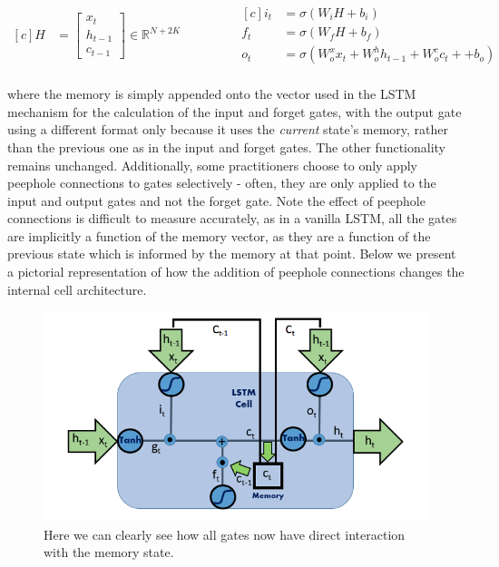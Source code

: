 \documentclass{article} %
\begin{document}
\begin{equation}
\begin{aligned}[c]
 H &= \left[ \begin{array}{cc}
         x_{t}  \\
         h_{t-1} \\
         c_{t-1}
    \end{array} \right] \in \mathbb{R}^{N+2K} \\
\end{aligned}
\qquad \qquad
    \begin{aligned}[c]
    i_{t} &= \sigma(W_{i}H + b_{i})\\
    f_{t} &= \sigma(W_{f}H + b_{f})\\
    o_{t} &= \sigma(W_{o}^{x}x_{t} + W_{o}^{h}h_{t-1} + W_{o}^{c}c_{t} +  + b_{o})\\
    \end{aligned}
\end{equation}

where the memory is simply appended onto the vector used in the LSTM mechanism for the calculation of the input and forget gates, with the output gate using a different format only because it uses the {\it current} state's memory, rather than the previous one as in the input and forget gates. The other functionality remains unchanged. Additionally, some practitioners choose to only apply peephole connections to gates selectively - often, they are only applied to the input and output gates and not the forget gate. Note the effect of peephole connections is difficult to measure accurately, as in a vanilla LSTM, all the gates are implicitly a function of the memory vector, as they are a function of the previous state which is informed by the memory at that point. Below we present a pictorial representation of how the addition of peephole connections changes the internal cell architecture.

\begin{figure}[H]
\begin{center}
\includegraphics[width=0.8 \linewidth]{LSTM_Peepholes.png} 
\end{center}
\caption{Here we can clearly see how all gates now have direct interaction with the memory state.}
\end{figure}
\end{document}
